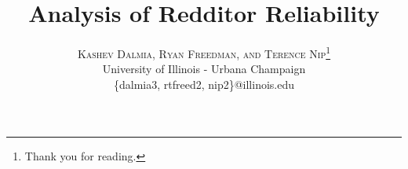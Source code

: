 \documentclass[twoside]{article}
\title{\vspace{-15mm}\fontsize{24pt}{10pt}\selectfont\textbf{Analysis of Redditor Reliability}} %
\author{
	\large
	\textsc{Kashev Dalmia, Ryan Freedman, and Terence Nip}\thanks{Thank you for reading.}\\[2mm] %
	\normalsize University of Illinois - Urbana Champaign \\ %
	\normalsize{\{dalmia3, rtfreed2, nip2\}@illinois.edu} %
	\vspace{-5mm}
}
\date{}
\begin{document}
	
	\maketitle %
	
	\thispagestyle{fancy} %
	
	
	\begin{abstract}
		
		\noindent
		
	\end{abstract}
	
	
\end{document}
